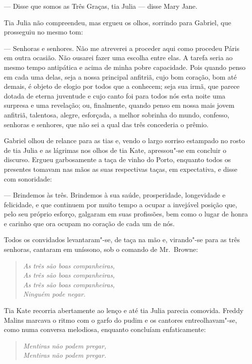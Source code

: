 --- Disse que somos as Três Graças, tia Julia --- disse Mary Jane.

Tia Julia não compreendeu, mas ergueu os olhos, sorrindo para Gabriel, que
prosseguiu no mesmo tom:

--- Senhoras e senhores.  Não me atreverei a proceder aqui como procedeu Páris
em outra ocasião.  Não ousarei fazer uma escolha entre elas.  A tarefa seria ao
mesmo tempo antipática e acima de minha pobre capacidade.  Pois quando penso em
cada uma delas, seja a nossa principal anfitriã, cujo bom coração, bom até
demais, é objeto de elogio por todos que a conhecem; seja sua irmã, que parece
dotada de eterna juventude e cujo canto foi para todos nós esta noite uma
surpresa e uma revelação; ou, finalmente, quando penso em nossa mais jovem
anfitriã, talentosa, alegre, esforçada, a melhor sobrinha do mundo, confesso,
senhoras e senhores, que não sei a qual das três concederia o prêmio.

Gabriel olhou de relance para as tias e, vendo o largo sorriso estampado no
rosto de tia Julia e as lágrimas nos olhos de tia Kate, apressou"-se em concluir
o discurso.  Ergueu garbosamente a taça de vinho do Porto, enquanto todos os
presentes tomavam nas mãos as suas respectivas taças, em expectativa, e disse
com sonoridade:

--- Brindemos às três.  Brindemos à sua saúde, prosperidade, longevidade e
felicidade, e que continuem por muito tempo a ocupar a invejável posição que,
pelo seu próprio esforço, galgaram em suas profissões, bem como o lugar de
honra e carinho que ora ocupam no coração de cada um de nós.

Todos os convidados levantaram"-se, de taça na mão e, virando"-se para as três
senhoras, cantaram em uníssono, sob o comando de Mr.~Browne:

\begin{verse}\itshape
As três são boas companheiras,\\
As três são boas companheiras,\\
As três são boas companheiras,\\
Ninguém pode negar.
\end{verse}

Tia Kate recorria abertamente ao lenço e até tia Julia parecia comovida.
Freddy Malins marcava o ritmo com o garfo do pudim e os cantores
entreolhavam"-se, como numa conversa melodiosa, enquanto concluíam
enfaticamente:

\begin{verse}\itshape
Mentiras não podem pregar,\\
Mentiras não podem pregar.
\end{verse}

